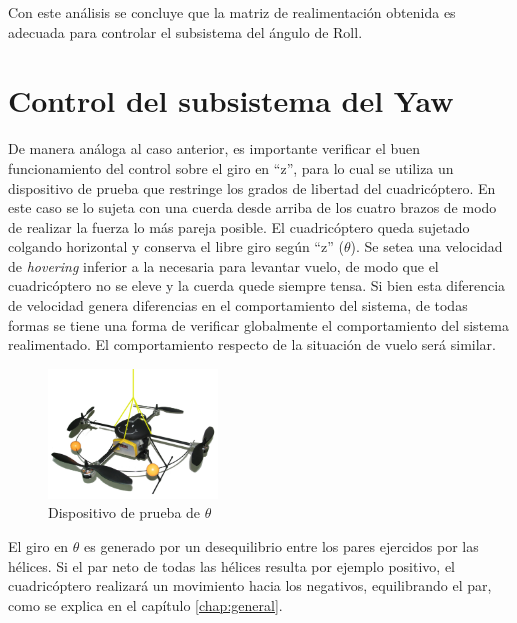 \documentclass[main]{subfiles}
\begin{document}
Con este an\'alisis se concluye que la matriz de realimentaci\'on obtenida es adecuada para controlar el subsistema del \'angulo de Roll.

\section{Control del subsistema del Yaw}

De manera an\'aloga al caso anterior, es importante verificar el buen funcionamiento del control sobre el giro en ``z'', para lo cual se utiliza un dispositivo de prueba que restringe los grados de libertad del cuadric\'optero. En este caso se lo sujeta con una cuerda desde arriba de los cuatro brazos de modo de realizar la fuerza lo m\'as pareja posible. El cuadric\'optero queda sujetado colgando horizontal y conserva el libre giro seg\'un ``z'' ($\theta$).
Se setea una velocidad de \emph{hovering} inferior a la necesaria para levantar vuelo, de modo que el cuadric\'optero no se eleve y la cuerda quede siempre tensa. Si bien esta diferencia de velocidad genera diferencias en el comportamiento del sistema, de todas formas se tiene una forma de verificar globalmente el comportamiento del sistema realimentado. El comportamiento respecto de la situaci\'on de vuelo ser\'a similar.\\

\begin{figure}
	\vspace{-20pt}
	\centering
	\includegraphics[width=0.4\textwidth]{./pics_test_control/dispositivo_theta.pdf}
	\caption{Dispositivo de prueba de $\theta$}
	\label{fig:thetadisp}
\end{figure}

El giro en $\theta$ es generado por un desequilibrio entre los pares ejercidos por las h\'elices. Si el par neto de todas las h\'elices resulta por ejemplo positivo, el cuadric\'optero realizar\'a un movimiento hacia los negativos, equilibrando el par, como se explica en el cap\'itulo \ref{chap:general}.\\
\end{document}
